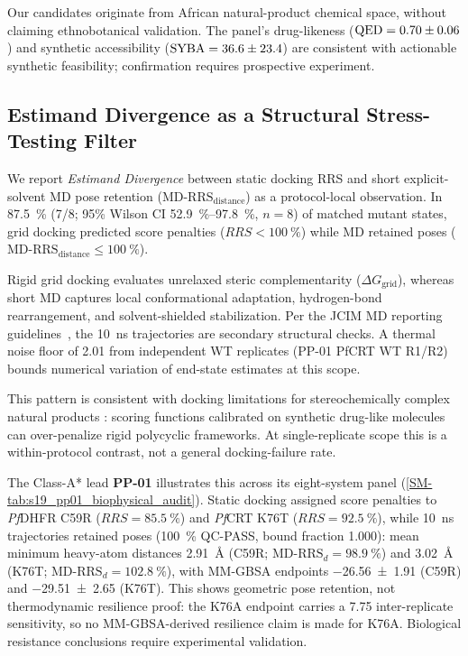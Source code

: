 \documentclass[journal=jcisd8,manuscript=article,layout=traditional]{achemso}
\begin{document}
Our candidates originate from African natural-product chemical space, without claiming ethnobotanical validation. The panel's drug-likeness ($\mathrm{QED} = \num{0.70 \pm 0.06}$) and synthetic accessibility ($\mathrm{SYBA} = \num{36.6 \pm 23.4}$) are consistent with actionable synthetic feasibility; confirmation requires prospective experiment.

\subsection{Estimand Divergence as a Structural Stress-Testing Filter}

We report \textit{Estimand Divergence} between static docking RRS and short explicit-solvent MD pose retention ($\mathrm{MD\text{-}RRS}_{\mathrm{distance}}$) as a protocol-local observation. In \qty{87.5}{\percent} (7/8; 95\% Wilson CI \qtyrange{52.9}{97.8}{\percent}, $n=\num{8}$) of matched mutant states, grid docking predicted score penalties ($RRS < \qty{100}{\percent}$) while MD retained poses ($\mathrm{MD\text{-}RRS}_{\mathrm{distance}} \le \qty{100}{\percent}$).

Rigid grid docking evaluates unrelaxed steric complementarity ($\Delta G_{\mathrm{grid}}$), whereas short MD captures local conformational adaptation, hydrogen-bond rearrangement, and solvent-shielded stabilization. Per the JCIM MD reporting guidelines~\citep{soares2023mdreport}, the \qty{10}{\ns} trajectories are secondary structural checks. A thermal noise floor of \qty{2.01}{\kcalmol} from independent WT replicates (PP-01 PfCRT WT R1/R2) bounds numerical variation of end-state estimates at this scope.

This pattern is consistent with docking limitations for stereochemically complex natural products \citep{ferreira2023docking}: scoring functions calibrated on synthetic drug-like molecules can over-penalize rigid polycyclic frameworks. At single-replicate scope this is a within-protocol contrast, not a general docking-failure rate.

The Class-A* lead \textbf{PP-01} illustrates this across its eight-system panel (\cref{SM-tab:s19_pp01_biophysical_audit}). Static docking assigned score penalties to \textit{Pf}DHFR C59R ($RRS = \qty{85.5}{\percent}$) and \textit{Pf}CRT K76T ($RRS = \qty{92.5}{\percent}$), while \qty{10}{\ns} trajectories retained poses (\qty{100}{\percent} QC-PASS, bound fraction \num{1.000}): mean minimum heavy-atom distances \qty{2.91}{\angstrom} (C59R; $\mathrm{MD\text{-}RRS}_d = \qty{98.9}{\percent}$) and \qty{3.02}{\angstrom} (K76T; $\mathrm{MD\text{-}RRS}_d = \qty{102.8}{\percent}$), with MM-GBSA endpoints \qty{-26.56 \pm 1.91}{\kcalmol} (C59R) and \qty{-29.51 \pm 2.65}{\kcalmol} (K76T). This shows geometric pose retention, not thermodynamic resilience proof: the K76A endpoint carries a \qty{7.75}{\kcalmol} inter-replicate sensitivity, so no MM-GBSA-derived resilience claim is made for K76A. Biological resistance conclusions require experimental validation.
\end{document}
